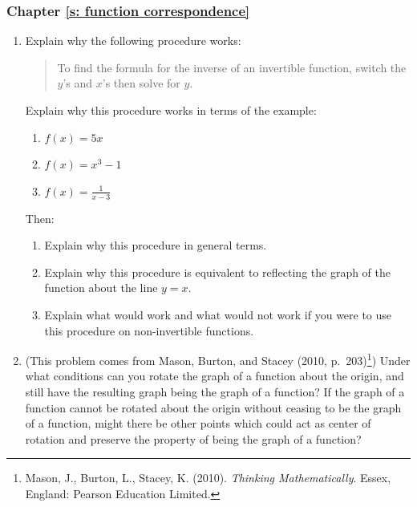 \documentclass[11pt]{article}
\theoremstyle{definition}
\begin{document}
\subsubsection*{Chapter \ref{s: function correspondence}}

\begin{enumerate}[resume]	
\item 
Explain why the following procedure works: 

\begin{quote}To find the formula for the inverse of an invertible function, switch the $y$'s and $x$'s then solve for $y$. \end{quote}

Explain why this procedure works in terms of the example:
	\begin{enumerate}
	\item $f(x) = 5x$
	\item $f(x) = x^3 -1$
	\item $f(x) = \frac{1}{x-3}$
	\end{enumerate}
Then:
	\begin{enumerate}[resume] 
	\item Explain why this procedure in general terms.
	\item Explain why this procedure is equivalent to reflecting the graph of the function about the line $y=x$.
	\item Explain what would work and what would not work if you were to use this procedure on non-invertible functions.
	\end{enumerate}
	
\item %
(This problem comes from Mason, Burton, and Stacey (2010, p.~203)\footnote{Mason, J., Burton, L., Stacey, K. (2010). {\it Thinking Mathematically}. Essex, England: Pearson Education Limited.}) Under what conditions can you rotate the graph of a function about the origin, and still have the resulting graph being the graph of a function? If the graph of a function cannot be rotated about the origin without ceasing to be the graph of a function, might there be other points which could act as center of rotation and preserve the property of being the graph of a function?


\end{enumerate}
\end{document}
